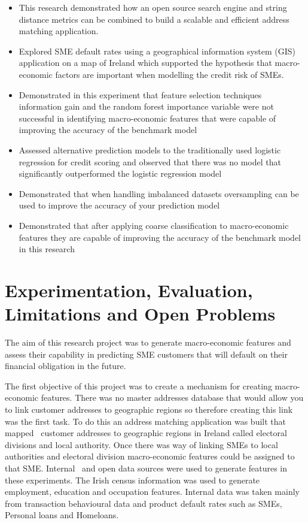 \begin{itemize}
	\item This research demonstrated how an open source search engine and string distance metrics can be combined to build a scalable and efficient address matching application.
	
	\item Explored SME default rates using a geographical information system (GIS) application on a map of Ireland which supported the hypothesis that macro-economic factors are important when modelling the credit risk of SMEs.
	
	\item Demonstrated in this experiment that feature selection techniques  information gain and the random forest importance variable were not successful in identifying macro-economic features that were capable of improving the accuracy of the benchmark model   
	
	\item Assessed alternative prediction models to the traditionally used logistic regression for credit scoring and observed that there was no model that significantly outperformed the logistic regression model
	
	\item Demonstrated that when handling imbalanced datasets oversampling can be used to improve the accuracy of your prediction model
	
	\item Demonstrated that after applying coarse classification to macro-economic features they are capable of improving the accuracy of the benchmark model in this research
\end{itemize}

\section{Experimentation, Evaluation, Limitations and Open Problems}
The aim of this research project was to generate macro-economic features and assess their capability in predicting SME customers that will default on their financial obligation in the future. 

The first objective of this project was to create a mechanism for creating macro-economic features. There was no master addresses database that would allow you to link customer addresses to geographic regions so therefore creating this link was the first task. To do this an address matching application was built that mapped \subjectname\ customer addresses to geographic regions in Ireland called electoral divisions and local authority. Once there was way of linking SMEs to local authorities and electoral division macro-economic features could be assigned to that SME. Internal \subjectname\ and open data sources were used to generate features in these experiments. The Irish census information was used to generate employment, education and occupation features. Internal data was taken mainly from transaction behavioural data and product default rates such as SMEs, Personal loans and Homeloans.  

